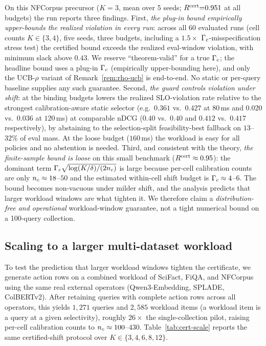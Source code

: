 On this NFCorpus precursor ($K{=}3$, mean over 5 seeds; $R^{\mathrm{cert}}{=}0.951$ at all budgets) the run reports three findings. First, \emph{the plug-in bound empirically upper-bounds the realized violation in every run}: across all 60 evaluated runs (cell counts $K\in\{3,4\}$, five seeds, three budgets, including a $1.5{\times}$ $\Gamma_c$-misspecification stress test) the certified bound exceeds the realized eval-window violation, with minimum slack above $0.43$. We reserve ``theorem-valid'' for a true $\Gamma_c$; the headline bound uses a plug-in $\Gamma_c$ (empirically upper-bounding here), and only the UCB-$\rho$ variant of Remark~\ref{rem:rho-ucb} is end-to-end. No static or per-query baseline supplies any such guarantee. Second, \emph{the guard controls violation under shift}: at the binding budgets \CWC{} lowers the realized SLO-violation rate relative to the strongest calibration-aware static selector (e.g.\ $0.361$ vs.\ $0.427$ at $80$\,ms and $0.020$ vs.\ $0.036$ at $120$\,ms) at comparable nDCG ($0.40$ vs.\ $0.40$ and $0.412$ vs.\ $0.417$ respectively), by abstaining to the selection-split feasibility-best fallback on $13$--$32\%$ of eval mass. At the loose budget ($160$\,ms) the workload is easy for all policies and no abstention is needed. Third, and consistent with the theory, \emph{the finite-sample bound is loose} on this small benchmark ($R^{\mathrm{cert}}\approx0.95$): the dominant term $\Gamma_c\sqrt{\log(K/\delta)/(2 n_c)}$ is large because per-cell calibration counts are only $n_c\approx18$--$50$ and the estimated within-cell shift budget is $\Gamma_c\approx4$--$6$. The bound becomes non-vacuous under milder shift, and the analysis predicts that larger workload windows are what tighten it. We therefore claim a \emph{distribution-free and operational} workload-window guarantee, not a tight numerical bound on a 100-query collection.

\subsection{Scaling to a larger multi-dataset workload}
\label{sec:results-scale}

To test the prediction that larger workload windows tighten the certificate, we generate action rows on a combined workload of SciFact, FiQA, and NFCorpus using the same real external operators (Qwen3-Embedding, SPLADE, ColBERTv2). After retaining queries with complete action rows across all operators, this yields $1{,}271$ queries and $2{,}585$ workload items (a workload item is a query at a given selectivity), roughly $26\times$ the single-collection pilot, raising per-cell calibration counts to $n_c\approx100$--$430$. Table~\ref{tab:cert-scale} reports the same certified-shift protocol over $K\in\{3,4,6,8,12\}$.

